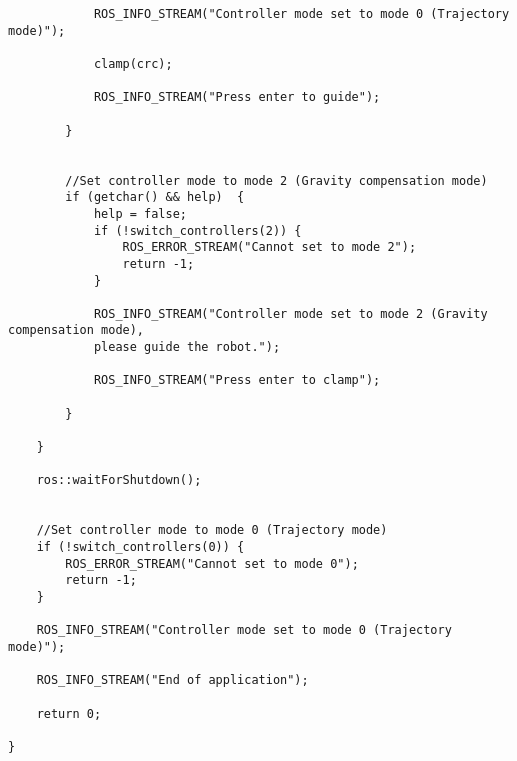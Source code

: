 \begin{lstlisting}
			ROS_INFO_STREAM("Controller mode set to mode 0 (Trajectory mode)");

			clamp(crc);

			ROS_INFO_STREAM("Press enter to guide");
			
		}


		//Set controller mode to mode 2 (Gravity compensation mode)
		if (getchar() && help)	{
			help = false;
			if (!switch_controllers(2)) {
				ROS_ERROR_STREAM("Cannot set to mode 2");
				return -1;
			}

			ROS_INFO_STREAM("Controller mode set to mode 2 (Gravity compensation mode),
			please guide the robot.");

			ROS_INFO_STREAM("Press enter to clamp");

		}

	}

	ros::waitForShutdown();


	//Set controller mode to mode 0 (Trajectory mode)
	if (!switch_controllers(0)) {
		ROS_ERROR_STREAM("Cannot set to mode 0");
		return -1;
	}

	ROS_INFO_STREAM("Controller mode set to mode 0 (Trajectory mode)");

	ROS_INFO_STREAM("End of application");

	return 0;

}
\end{lstlisting}

